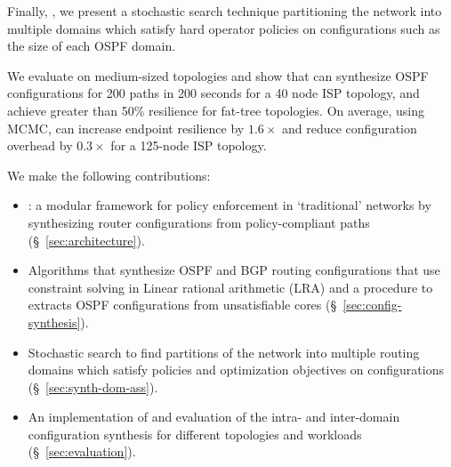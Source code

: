 
Finally, , we present a stochastic search technique 
partitioning the network into multiple domains which satisfy hard
operator policies on configurations such as  the size of each OSPF
domain. 

We evaluate \name on medium-sized topologies and show that
\name can synthesize OSPF configurations for 200 paths in 200
seconds for a 40 node ISP topology, and achieve greater than 
50\% resilience for fat-tree topologies.
 On average, using MCMC, \name can increase
endpoint resilience by $1.6\times$ and 
reduce configuration overhead
by $0.3\times$
for a 125-node ISP topology.



 We make the following contributions:
\begin{itemize}
	\item \name: a modular framework 
	for policy enforcement in `traditional' networks
	by synthesizing router configurations from policy-compliant paths (\S~\ref{sec:architecture}). 
	\item Algorithms that synthesize OSPF and BGP routing configurations that use
	constraint solving in Linear rational arithmetic (LRA) and 
	a procedure to extracts OSPF configurations from 
	unsatisfiable cores (\S~\ref{sec:config-synthesis}). 
	\item Stochastic search to find 
	partitions of the network into multiple routing domains which
	satisfy policies and optimization objectives on configurations (\S~\ref{sec:synth-dom-ass}).
	\item An implementation of \name and evaluation of the 
	intra- and inter-domain configuration synthesis for different
	topologies and workloads (\S~\ref{sec:evaluation}). 
\end{itemize}
